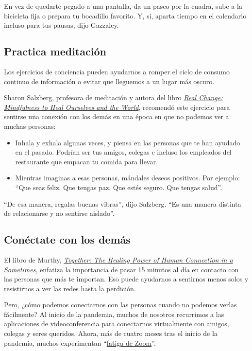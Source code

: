 En vez de quedarte pegado a una pantalla, da un paseo por la cuadra,
sube a la bicicleta fija o prepara tu bocadillo favorito. Y, sí, aparta
tiempo en el calendario incluso para tus pausas, dijo Gazzaley.

\hypertarget{practica-meditaciuxf3n}{%
\subsection{Practica meditación}\label{practica-meditaciuxf3n}}

Los ejercicios de conciencia pueden ayudarnos a romper el ciclo de
consumo continuo de información o evitar que lleguemos a un lugar más
oscuro.

Sharon Salzberg, profesora de meditación y autora del libro
\href{https://www.sharonsalzberg.com/realchange/}{\emph{Real Change:
Mindfulness to Heal Ourselves and the World}}, recomendó este ejercicio
para sentirse una conexión con los demás en una época en que no podemos
ver a muchas personas:

\begin{itemize}
\item
  Inhala y exhala algunas veces, y piensa en las personas que te han
  ayudado en el pasado. Podrían ser tus amigos, colegas e incluso los
  empleados del restaurante que empacan tu comida para llevar.
\item
  Mientras imaginas a esas personas, mándales deseos positivos. Por
  ejemplo: ``Que seas feliz. Que tengas paz. Que estés seguro. Que
  tengas salud''.
\end{itemize}

``De esa manera, regalas buenas vibras'', dijo Salzberg. ``Es una manera
distinta de relacionarse y no sentirse aislado''.

\hypertarget{conuxe9ctate-con-los-demuxe1s}{%
\subsection{Conéctate con los
demás}\label{conuxe9ctate-con-los-demuxe1s}}

El libro de Murthy,
\href{http://www.harperwave.com/book/9780062913296/Together-Vivek-H.-Murthy-MD/}{\emph{Together:
The Healing Power of Human Connection in a Sometimes}}, enfatiza la
importancia de pasar 15 minutos al día en contacto con las personas que
más te importan. Eso puede ayudarnos a sentirnos menos solos y
resistirnos a ver las redes hasta la perdición.

Pero, ¿cómo podemos conectarnos con las personas cuando no podemos
verlas fácilmente? Al inicio de la pandemia, muchos de nosotros
recurrimos a las aplicaciones de videoconferencia para conectarnos
virtualmente con amigos, colegas y seres queridos. Ahora, más de cuatro
meses tras el inicio de la pandemia, muchos experimentan
``\href{https://www.nytimes3xbfgragh.onion/2020/05/20/smarter-living/coronavirus-zoom-facetime-fatigue.html}{fatiga
de Zoom}''.


